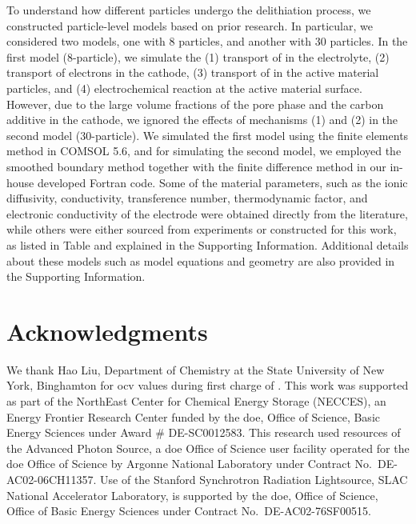\documentclass{article}
\begin{document}
To understand how different particles undergo the delithiation
process, we constructed particle-level models based on prior
research. In particular, we considered two models, one with 8
particles, and another with 30 particles. In the first model
(8-particle), we simulate the (1) transport of  in the
electrolyte, (2) transport of electrons in the cathode, (3) transport
of  in the active material particles, and (4) electrochemical
reaction at the active material surface. However, due to the large
volume fractions of the pore phase and the carbon additive in the
cathode, we ignored the effects of mechanisms (1) and (2) in the
second model (30-particle). We simulated the first model using the
finite elements method in COMSOL 5.6, and for simulating the second
model, we employed the smoothed boundary method \cite{thornton2012}
together with the finite difference method in our in-house developed
Fortran code. Some of the material parameters, such as the ionic
diffusivity, conductivity, transference number, thermodynamic factor,
and electronic conductivity of the \nca{} electrode were obtained
directly from the literature\cite{lindbergh2008,lindbergh2008-2},
while others were either sourced from experiments or constructed for
this work, as listed in Table  and
explained in the Supporting Information. Additional details about
these models such as model equations and geometry are also provided in
the Supporting Information.


\section*{Acknowledgments}

We thank Hao Liu, Department of Chemistry at the State University of
New York, Binghamton for \gls{ocv} values during first charge of
\nca{}. This work was supported as part of the NorthEast Center for
Chemical Energy Storage (NECCES), an Energy Frontier Research Center
funded by the \gls{doe}, Office of Science, Basic Energy Sciences
under Award \# DE-SC0012583. This research used resources of the
Advanced Photon Source, a \gls{doe} Office of Science user facility
operated for the \gls{doe} Office of Science by Argonne National
Laboratory under Contract No.\ DE-AC02-06CH11357. Use of the Stanford
Synchrotron Radiation Lightsource, SLAC National Accelerator
Laboratory, is supported by the \gls{doe}, Office of Science, Office
of Basic Energy Sciences under Contract No.\ DE-AC02-76SF00515.


\newpage
\end{document}
